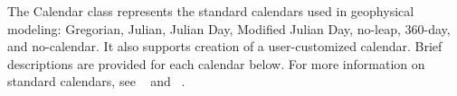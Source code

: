 
\label{sec:Calendar}
The Calendar class represents the standard calendars used in 
geophysical modeling:  Gregorian, Julian, Julian Day, Modified Julian Day, 
no-leap, 360-day, and no-calendar.  It also supports creation of a 
user-customized calendar.  Brief descriptions are provided for each calendar 
below.  For more information on standard calendars, 
see ~\cite{Seidelman} and ~\cite{Meyer1}.
